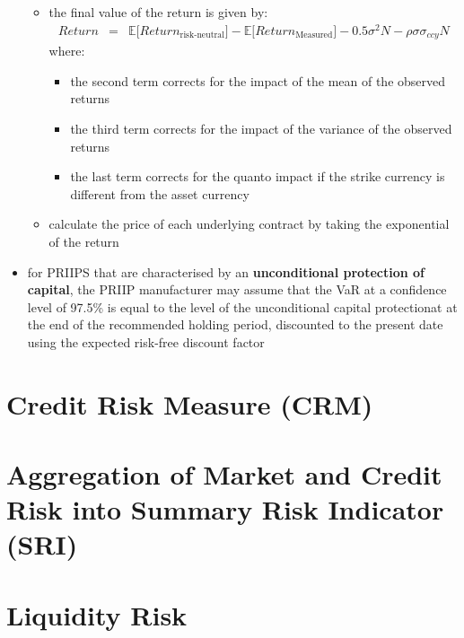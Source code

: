 \begin{itemize}
\begin{itemize}
		\item the final value of the return is given by:
		\begin{eqnarray}
		\nonumber
		Return &=& \mathbb{E}\Big[Return_{\text{risk-neutral}}\Big] - \mathbb{E}\Big[Return_{\text{Measured}}\Big] - 0.5\sigma^{2}N - \rho\sigma\sigma_{ccy}N
		\end{eqnarray}
		where:
		\begin{itemize}
			\item the second term corrects for the impact of the mean of the observed returns
			\item the third term corrects for the impact of the variance of the observed returns
			\item the last term corrects for the quanto impact if the strike currency is different from the asset currency
		\end{itemize}
		\item calculate the price of each underlying contract by taking the exponential of the return
	\end{itemize}
	\item for PRIIPS that are characterised by an \textbf{\color{blue}unconditional protection of capital}, the PRIIP manufacturer may assume that the VaR at a confidence level of 97.5\% is equal to the level of the unconditional capital protectionat at the end of the recommended holding period, discounted to the present date using the expected risk-free discount factor
\end{itemize}

\chapter{Credit Risk Measure (CRM)}

\chapter{Aggregation of Market and Credit Risk into Summary Risk Indicator (SRI)}

\chapter{Liquidity Risk}
